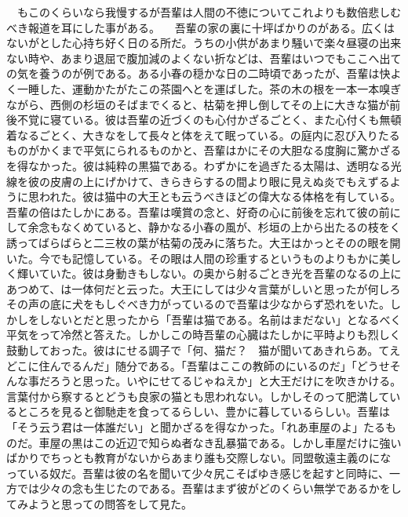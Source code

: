 \documentclass[a5j]{ltjtbook}
\begin{document}
　もこのくらいなら我慢するが吾輩は人間の不徳についてこれよりも数倍悲しむべき報道を耳にした事がある。 \newline
　吾輩の家の裏に十坪ばかりのがある。広くはないがとした心持ち好く日のる所だ。うちの小供があまり騒いで楽々昼寝の出来ない時や、あまり退屈で腹加減のよくない折などは、吾輩はいつでもここへ出ての気を養うのが例である。ある小春の穏かな日の二時頃であったが、吾輩は快よく一睡した、運動かたがたこの茶園へとを運ばした。茶の木の根を一本一本嗅ぎながら、西側の杉垣のそばまでくると、枯菊を押し倒してその上に大きな猫が前後不覚に寝ている。彼は吾輩の近づくのも心付かざるごとく、また心付くも無頓着なるごとく、大きなをして長々と体をえて眠っている。の庭内に忍び入りたるものがかくまで平気にられるものかと、吾輩はかにその大胆なる度胸に驚かざるを得なかった。彼は純粋の黒猫である。わずかにを過ぎたる太陽は、透明なる光線を彼の皮膚の上にげかけて、きらきらするの間より眼に見えぬ炎でもえずるように思われた。彼は猫中の大王とも云うべきほどの偉大なる体格を有している。吾輩の倍はたしかにある。吾輩は嘆賞の念と、好奇の心に前後を忘れて彼の前にして余念もなくめていると、静かなる小春の風が、杉垣の上から出たるの枝をく誘ってばらばらと二三枚の葉が枯菊の茂みに落ちた。大王はかっとそのの眼を開いた。今でも記憶している。その眼は人間の珍重するというものよりもかに美しく輝いていた。彼は身動きもしない。の奥から射るごとき光を吾輩のなるの上にあつめて、は一体何だと云った。大王にしては少々言葉がしいと思ったが何しろその声の底に犬をもしぐべき力がっているので吾輩は少なからず恐れをいた。しかしをしないとだと思ったから「吾輩は猫である。名前はまだない」となるべく平気をって冷然と答えた。しかしこの時吾輩の心臓はたしかに平時よりも烈しく鼓動しておった。彼はにせる調子で「何、猫だ？　猫が聞いてあきれらあ。てえどこに住んでるんだ」随分である。「吾輩はここの教師のにいるのだ」「どうせそんな事だろうと思った。いやにせてるじゃねえか」と大王だけにを吹きかける。言葉付から察するとどうも良家の猫とも思われない。しかしそのって肥満しているところを見ると御馳走を食ってるらしい、豊かに暮しているらしい。吾輩は「そう云う君は一体誰だい」と聞かざるを得なかった。「れあ車屋のよ」たるものだ。車屋の黒はこの近辺で知らぬ者なき乱暴猫である。しかし車屋だけに強いばかりでちっとも教育がないからあまり誰も交際しない。同盟敬遠主義のになっている奴だ。吾輩は彼の名を聞いて少々尻こそばゆき感じを起すと同時に、一方では少々の念も生じたのである。吾輩はまず彼がどのくらい無学であるかをしてみようと思っての問答をして見た。 \newline
\end{document}

